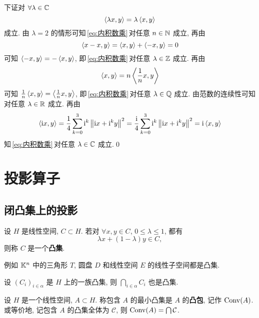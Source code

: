 \begin{Proof}
        下证对 $ \forall\lambda\in\mathbb{C} $
        \begin{equation}\label{eq:内积数乘}
            \left\langle \lambda x, y \right\rangle=\lambda\left\langle x, y \right\rangle
        \end{equation}
        成立. 由 $ \lambda=2 $ 的情形可知\,\eqref{eq:内积数乘}\,对任意 $ n\in\mathbb{N} $ 成立, 再由
        \[
            \left\langle x-x, y \right\rangle=\left\langle x, y \right\rangle+\left\langle -x, y \right\rangle=0
        \]
        可知 $ \left\langle -x, y \right\rangle=-\left\langle x, y \right\rangle $, 即\,\eqref{eq:内积数乘}\,对任意 $ \lambda\in\mathbb{Z} $ 成立. 再由
        \[
            \left\langle x, y \right\rangle=n\left\langle \frac{1}{n}x, y \right\rangle
        \]
        可知 $ \frac{1}{n}\left\langle x, y \right\rangle=\left\langle \frac{1}{n}x, y \right\rangle $, 即\,\eqref{eq:内积数乘}\,对任意 $ \lambda\in\mathbb{Q} $ 成立. 由范数的连续性可知对任意 $ \lambda\in\mathbb{R} $ 成立. 再由
        \[
            \left\langle \mathrm{i} x, y \right\rangle=\frac{1}{4}\sum_{k=0}^{3}\mathrm{i}^{k}\left\| \mathrm{i} x+\mathrm{i}^{k}y \right\|^{2}=\frac{\mathrm{i}}{4}\sum_{k=0}^{3}\mathrm{i}^{k}\left\| \mathrm{i} x+\mathrm{i}^{k}y \right\|^{2}=\mathrm{i}\left\langle x, y \right\rangle
        \]
        知\,\eqref{eq:内积数乘}\,对任意 $ \lambda\in\mathbb{C} $ 成立.\qed
    \end{Proof}

\section{投影算子}
    \subsection{闭凸集上的投影}

    \begin{Definition}[凸集]\label{def:凸集}
        设 $ H $ 是线性空间, $ C\subset H $. 若对 $ \forall x, y\in C $, $ 0\leqslant\lambda\leqslant1 $, 都有
        \[
            \lambda x+(1-\lambda)y\in C,
        \]
        则称 $ C $ 是一个\textbf{凸集}.
    \end{Definition}
    例如 $ \mathbb{K}^{n} $ 中的三角形 $ T $, 圆盘 $ D $ 和线性空间 $ E $ 的线性子空间都是凸集.

    \begin{Proposition}
        设 $ (C_{i})_{i\in\alpha} $ 是 $ H $ 上的一族凸集, 则 $ \bigcap_{i\in\alpha}C_{i} $ 也是凸集.
    \end{Proposition}

    \begin{Definition}[凸包]\label{def:凸包}
         设 $ H $ 是一个线性空间, $ A\subset H $. 称包含 $ A $ 的最小凸集是 $ A $ 的\textbf{凸包}, 记作 $ \operatorname{Conv}(A) $. 或等价地, 记包含 $ A $ 的凸集全体为 $ \mathcal{C} $, 则 $ \operatorname{Conv}(A)=\bigcap \mathcal{C} $.
    \end{Definition}

